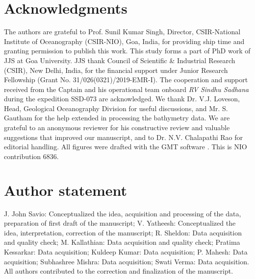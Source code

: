 \documentclass[twocolumn]{article}
\begin{document}

\section*{Acknowledgments}

The authors are grateful to Prof. Sunil Kumar Singh, Director, CSIR-National Institute of Oceanography (CSIR-NIO), Goa, India, for providing ship time and granting permission to publish this work. This study forms a part of PhD work of JJS at Goa University. JJS thank Council of Scientific \& Industrial Research (CSIR), New Delhi, India, for the financial support under Junior Research Fellowship (Grant No. 31/026(0321)/2019-EMR-I). The cooperation and support received from the Captain and his operational team onboard \textit{RV Sindhu Sadhana} during the expedition SSD-073 are acknowledged. We thank Dr. V.J. Loveson, Head, Geological Oceanography Division for useful discussions, and Mr. S. Gautham for the help extended in processing the bathymetry data. We are grateful to an anonymous reviewer for his constructive review and valuable suggestions that improved our manuscript, and to Dr. N.V. Chalapathi Rao for editorial handling. All figures were drafted with the GMT software  \citep{Wessel2019}. This is NIO contribution 6836.



\section*{Author statement}

J. John Savio: Conceptualized the idea, acquisition and processing of the data, preparation of first draft of the manuscript; V. Yatheesh: Conceptualized the idea, interpretation, correction of the manuscript; R. Sheldon: Data acquisition and quality check; M. Kallathian: Data acquisition and quality check; Pratima Kessarkar: Data acquisition; Kuldeep Kumar: Data acquisition; P. Mahesh: Data acquisition; Subhashree Mishra: Data acquisition; Swati Verma: Data acquisition. All authors contributed to the correction and finalization of the manuscript.





\appendix
\end{document}
